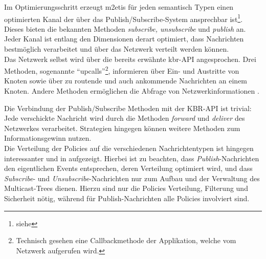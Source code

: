 Im Optimierungsschritt erzeugt \ac{m2etis} für jeden semantisch Typen einen optimierten Kanal der über das Publish/Subscribe-System ansprechbar ist\footnote{siehe }. Dieses bieten die bekannten Methoden \emph{subscribe, unsubscribe} und \emph{publish} an. Jeder Kanal ist entlang den Dimensionen derart optimiert, dass Nachrichten bestmöglich verarbeitet und über das Netzwerk verteilt werden können.\\
Das Netzwerk selbst wird über die bereits erwähnte \ac{kbr}-API angesprochen. Drei Methoden, sogenannte ``upcalls''\footnote{Technisch gesehen eine Callbackmethode der Applikation, welche vom Netzwerk aufgerufen wird.},  informieren über Ein- und Austritte von Knoten sowie über zu routende und auch ankommende Nachrichten an einem Knoten. Andere Methoden ermöglichen die Abfrage von Netzwerkinformationen \cite{Dabek2003Towards}.

Die Verbindung der Publish/Subscribe Methoden mit der KBR-API ist trivial: Jede verschickte Nachricht wird durch die Methoden \emph{forward} und \emph{deliver} des Netzwerkes verarbeitet. Strategien hingegen können weitere Methoden zum Informationsgewinn nutzen.\\
Die Verteilung der Policies auf die verschiedenen Nachrichtentypen ist hingegen interessanter und in  aufgezeigt. Hierbei ist zu beachten, dass \emph{Publish}-Nachrichten den eigentlichen Events entsprechen, deren Verteilung optimiert wird, und dass \emph{Subscribe}- und \emph{Unsubscribe}-Nachrichten nur zum Aufbau und der Verwaltung des Multicast-Trees dienen. Hierzu sind nur die Policies Verteilung, Filterung und Sicherheit nötig, während für Publish-Nachrichten alle Policies involviert sind.

\begin{table}[!h]
\caption{Verbindungsmatrix}
\label{tab:verbindungsmatrix}
\end{table}

